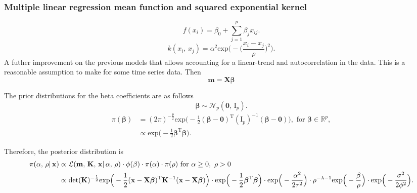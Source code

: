       \subsubsection{Multiple linear regression mean function and squared exponential kernel}

         \[f(x_{i}) = \beta_{0} + \sum_{j=1}^{p} \beta_{j} x_{ij}.\]
         \[k(x_{i},\, x_{j}) = \alpha^{2} \text{exp} \bigg(- \Big(\frac{x_i - x_j}{\rho} \Big)^2 \bigg).\]
         A futher improvement on the previous models that allows accounting for a linear-trend and autocorrelation in the data. This is a reasonable assumption to make for some time series data.
         Then \[\mathbf{m} = \mathbf{X}\boldsymbol{\beta}\]

         The prior distributions for the beta coefficients are as follows
         \[\boldsymbol{\beta} \sim \mathcal{N}_{p}(\mathbf{0},\, \text{I}_{p}).\]
         \begin{align*}
            \pi(\boldsymbol{\beta}) 
            & = (2\pi)^{-\frac{p}{2}} \text{exp} \Big( -\frac{1}{2} (\boldsymbol{\beta} - \mathbf{0})^{\text{T}} (\text{I}_{p})^{-1}(\boldsymbol{\beta} - \mathbf{0}) \Big), \text{ for } \boldsymbol{\beta} \in \mathbb{R}^{p},\\
            & \propto \text{exp} \Big( -\frac{1}{2} \boldsymbol{\beta}^{\text{T}} \boldsymbol{\beta} \Big).
         \end{align*}

         Therefore, the posterior distribution is
         \begin{align*}
            \pi(\alpha,\, \rho| \, \mathbf{x}) 
            & \propto \mathcal{L}(\mathbf{m},\, \mathbf{K},\, \mathbf{x}| \, \alpha,\, \rho) 
            \cdot \phi(\beta)
            \cdot \pi(\alpha) 
            \cdot \pi(\rho) 
            \text{ for } \alpha \geq 0,\ \rho > 0\\
            & \propto \text{det}(\mathbf{K})^{-\frac{1}{2}} 
            \text{exp} \Big(-\frac{1}{2} (\mathbf{x} - \mathbf{X}\boldsymbol{\beta})^{\text{\text{T}}} \mathbf{K}^{-1} (\mathbf{x} - \mathbf{X}\boldsymbol{\beta}) \Big)
            \cdot \text{exp} \Big( -\frac{1}{2} \boldsymbol{\beta}^{\text{T}} \boldsymbol{\beta} \Big)
            \cdot \text{exp} \Big(-\frac{\alpha^2}{2\tau^2} \Big) 
            \cdot \rho^{-\lambda-1} \text{exp} \Big(-\frac{\beta}{\rho} \Big) 
            \cdot \text{exp} \Big(-\frac{\sigma^2}{2\phi^2} \Big).
         \end{align*}

